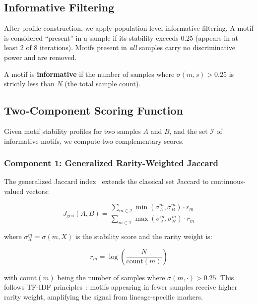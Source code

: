 \documentclass{../yalumba}
\begin{document}
\subsection{Informative Filtering}

After profile construction, we apply population-level informative filtering.
A motif is considered ``present'' in a sample if its stability exceeds 0.25
(appears in at least 2 of 8 iterations).  Motifs present in \emph{all} samples
carry no discriminative power and are removed.

\begin{definition}
A motif is \textbf{informative} if the number of samples where
$\sigma(m, s) > 0.25$ is strictly less than $N$ (the total sample count).
\end{definition}

\subsection{Two-Component Scoring Function}

Given motif stability profiles for two samples $A$ and $B$, and the set
$\mathcal{I}$ of informative motifs, we compute two complementary scores.

\subsubsection{Component 1: Generalized Rarity-Weighted Jaccard}

The generalized Jaccard index~\cite{bray1957} extends the classical set Jaccard
to continuous-valued vectors:

\begin{equation}
  J_{\text{gen}}(A, B) =
  \frac{\displaystyle\sum_{m \in \mathcal{I}} \min(\sigma_A^m, \sigma_B^m) \cdot r_m}
       {\displaystyle\sum_{m \in \mathcal{I}} \max(\sigma_A^m, \sigma_B^m) \cdot r_m}
  \label{eq:gen-jaccard}
\end{equation}

where $\sigma_X^m = \sigma(m, X)$ is the stability score and the rarity weight
is:

\begin{equation}
  r_m = \log\!\left(\frac{N}{\text{count}(m)}\right)
  \label{eq:rarity}
\end{equation}

with $\text{count}(m)$ being the number of samples where $\sigma(m, \cdot) > 0.25$.
This follows TF-IDF principles~\cite{salton1988tfidf}: motifs appearing in fewer
samples receive higher rarity weight, amplifying the signal from lineage-specific
markers.
\end{document}
